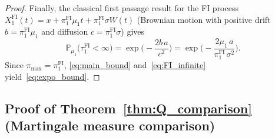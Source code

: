 \documentclass[12pt]{article}
\theoremstyle{remark}
\theoremstyle{definition}
\newcommand{\Prob}{\mathbb{P}}
\newcommand{\FI}{\mathrm{FI}}
\begin{document}
\begin{proof}
Finally, the classical first passage result for the FI process
$X_1^{\FI}(t) = x + \pi_1^{\FI}\mu_1 t + \pi_1^{\FI}\sigma W(t)$
(Brownian motion with positive drift $b = \pi_1^{\FI}\mu_1$ and
diffusion $c = \pi_1^{\FI}\sigma$) gives
\begin{equation}\label{eq:FI_infinite}
  \Prob_{\mu_1}\bigl(\tau_1^{\FI} < \infty\bigr)
  = \exp\!\biggl(-\frac{2b\,a}{c^2}\biggr)
  = \exp\!\biggl(-\frac{2\mu_1\,a}{\pi_1^{\FI}\,\sigma^2}\biggr).
\end{equation}
Since $\pi_{\max} = \pi_1^{\FI}$, \eqref{eq:main_bound}
and~\eqref{eq:FI_infinite} yield~\eqref{eq:expo_bound}.
\end{proof}

\subsection{Proof of Theorem~\ref{thm:Q_comparison}
  (Martingale measure comparison)}
\label{sec:proof_Q}
\end{document}
